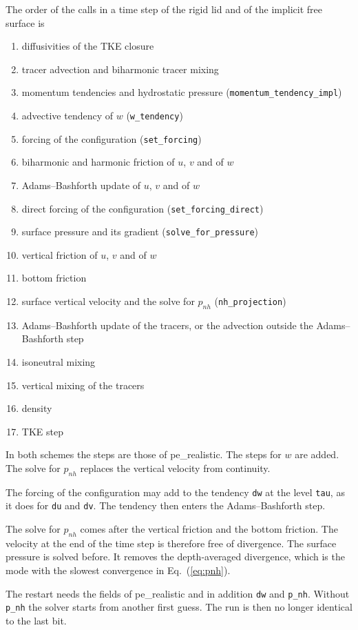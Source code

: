 \documentclass[12pt]{article}
\newcommand{\eq }  [1]{Eq.~(\ref{#1})}  %
\begin{document}
The order of the calls in a time step of the rigid lid and of the implicit free surface is
\begin{enumerate}
\item diffusivities of the TKE closure
\item tracer advection and biharmonic tracer mixing
\item momentum tendencies and hydrostatic pressure (\verb|momentum_tendency_impl|)
\item advective tendency of $w$ (\verb|w_tendency|)
\item forcing of the configuration (\verb|set_forcing|)
\item biharmonic and harmonic friction of $u$, $v$ and of $w$
\item Adams--Bashforth update of $u$, $v$ and of $w$
\item direct forcing of the configuration (\verb|set_forcing_direct|)
\item surface pressure and its gradient (\verb|solve_for_pressure|)
\item vertical friction of $u$, $v$ and of $w$
\item bottom friction
\item surface vertical velocity and the solve for $p_{nh}$ (\verb|nh_projection|)
\item Adams--Bashforth update of the tracers, or the advection outside the Adams--Bashforth step
\item isoneutral mixing
\item vertical mixing of the tracers
\item density
\item TKE step
\end{enumerate}
In both schemes the steps are those of pe\_realistic.
The steps for $w$ are added.
The solve for $p_{nh}$ replaces the vertical velocity from continuity.

The forcing of the configuration may add to the tendency \verb|dw| at the level \verb|tau|, as it does for \verb|du| and \verb|dv|.
The tendency then enters the Adams--Bashforth step.

The solve for $p_{nh}$ comes after the vertical friction and the bottom friction.
The velocity at the end of the time step is therefore free of divergence.
The surface pressure is solved before.
It removes the depth-averaged divergence, which is the mode with the slowest convergence in \eq{eq:pnh}.

The restart needs the fields of pe\_realistic and in addition \verb|dw| and \verb|p_nh|.
Without \verb|p_nh| the solver starts from another first guess.
The run is then no longer identical to the last bit.
\end{document}
